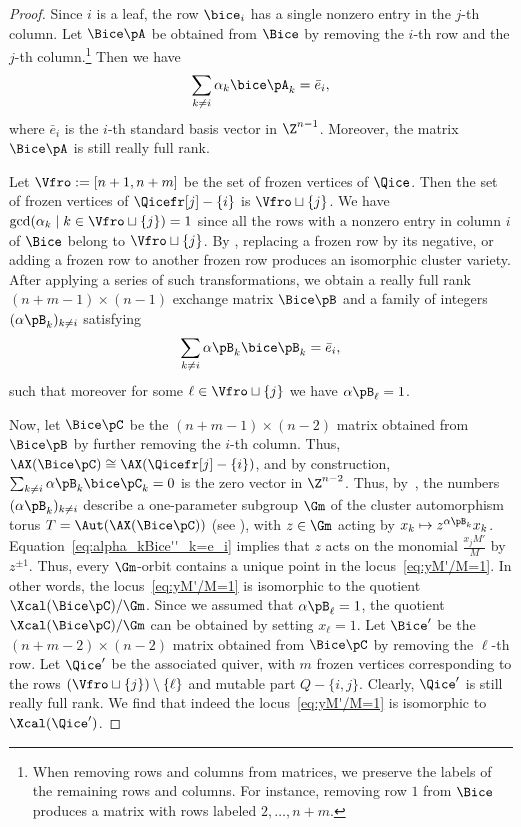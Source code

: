 \begin{proof}
%
Since $i$ is a leaf, the row $\bice_i$ has a single nonzero entry in the $j$-th column. Let $\Bice\pA$ be obtained from $\Bice$ by removing the $i$-th row and the $j$-th column.\footnote{When removing rows and columns from matrices, we preserve the labels of the remaining rows and columns. For instance, removing row $1$ from $\Bice$ produces a matrix with rows labeled $2,\dots,n+m$.} Then we have
  \begin{equation*}%
    \sum_{k\neq i} \alpha_k \bice\pA_k=\bar e_i,
  \end{equation*}
where $\bar e_i$ is the $i$-th standard basis vector in $\Z^{n-1}$. Moreover, the matrix $\Bice\pA$ is still really full rank.
%
%
%
%
%

Let $\Vfro:=[n+1,n+m]$ be the set of frozen vertices of $\Qice$. Then the set of frozen vertices of $\Qicefr[j]-\{i\}$ is $\Vfro\sqcup\{j\}$.  We have $\gcd(\alpha_k\mid k\in \Vfro\sqcup\{j\})=1$
%
 since all the rows with a nonzero entry in column $i$ of $\Bice$ belong to $\Vfro\sqcup\{j\}$.  By \cite[Section 5]{LS}, replacing a frozen row by its negative, or adding a frozen row to another frozen row produces an isomorphic cluster variety.  After applying a series of such transformations, we obtain a really full rank $(n+m-1)\times(n-1)$ exchange matrix $\Bice\pB$ and a family of integers $(\alpha\pB_k)_{k\neq i}$ satisfying 
   \begin{equation}\label{eq:alpha_kBice''_k=e_i}
    \sum_{k\neq i} \alpha\pB_k \bice\pB_k=\bar e_i,
  \end{equation}
such that moreover for some $\ell\in\Vfro\sqcup\{j\}$ we have $\alpha\pB_\ell=1$. 

Now, let $\Bice\pC$ be the $(n+m-1)\times(n-2)$ matrix obtained from $\Bice\pB$ by further removing the $i$-th column. Thus, $\AX(\Bice\pC)\cong \AX(\Qicefr[j] - \{i\})$, and by construction, $\sum_{k\neq i} \alpha\pB_k\bice\pC_k=0$ is the zero vector in $\Z^{n-2}$.  Thus, by~\cite[Proposition 5.1]{LS}, the numbers $(\alpha\pB_k)_{k\neq i}$ describe a one-parameter subgroup $\Gm$ of the cluster automorphism torus $T=\Aut(\AX(\Bice\pC))$ (see \cite[Section 5]{LS}), with $z\in\Gm$ acting by $x_k\mapsto z^{\alpha\pB_k}x_k$. Equation~\eqref{eq:alpha_kBice''_k=e_i} implies that $z$ acts on the monomial $\frac{x_jM'}{M}$ by $z^{\pm 1}$. Thus, every $\Gm$-orbit contains a unique point in the locus~\eqref{eq:yM'/M=1}. In other words, the locus~\eqref{eq:yM'/M=1} is isomorphic to the quotient $\Xcal(\Bice\pC)/\Gm$.  Since we assumed that $\alpha\pB_\ell = 1$, the quotient $\Xcal(\Bice\pC)/\Gm$ can be obtained by setting $x_\ell=1$.  Let $\Bice'$ be the $(n+m-2)\times(n-2)$ matrix obtained from $\Bice\pC$ by removing the $\ell$-th row. Let $\Qice'$ be the associated quiver, with $m$ frozen vertices corresponding to the rows $(\Vfro\sqcup\{j\})\setminus\{\ell\}$ and mutable part $Q-\{i,j\}$. Clearly, $\Qice'$ is still really full rank. We find that indeed the locus~\eqref{eq:yM'/M=1} is isomorphic to $\Xcal(\Qice')$.
%
%
\end{proof}

